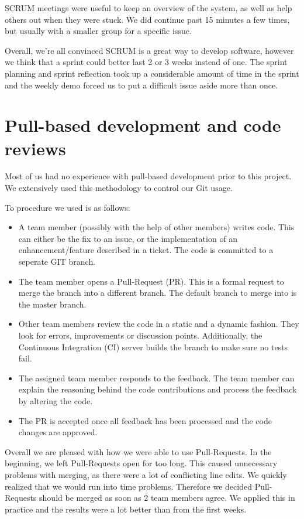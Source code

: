 SCRUM meetings were useful to keep an overview of the system, as well as help others out when they were stuck.
We did continue past 15 minutes a few times, but usually with a smaller group for a specific issue.

Overall, we're all convinced SCRUM is a great way to develop software, however we think that a sprint could better last 2 or 3 weeks instead of one.
The sprint planning and sprint reflection took up a considerable amount of time in the sprint and the weekly demo forced us to put a difficult issue aside more than once.

\section{Pull-based development and code reviews}
Most of us had no experience with pull-based development prior to this project.
We extensively used this methodology to control our Git usage.

To procedure we used is as follows:
\begin{itemize}
\item A team member (possibly with the help of other members) writes code.
This can either be the fix to an issue, or the implementation of an enhancement/feature described in a ticket.
The code is committed to a seperate GIT branch.

\item The team member opens a Pull-Request (PR). 
This is a formal request to merge the branch into a different branch.
The default branch to merge into is the master branch.

\item Other team members review the code in a static and a dynamic fashion.
They look for errors, improvements or discussion points. 
Additionally, the Continuous Integration (CI) server builds the branch to make sure no tests fail.

\item The assigned team member responds to the feedback.
The team member can explain the reasoning behind the code contributions and process the feedback by altering the code.

\item The PR is accepted once all feedback has been processed and the code changes are approved.
\end{itemize}

Overall we are pleased with how we were able to use Pull-Requests.
In the beginning, we left Pull-Requests open for too long.
This caused unnecessary problems with merging, as there were a lot of conflicting line edits.
We quickly realized that we would run into time problems.
Therefore we decided Pull-Requests should be merged as soon as 2 team members agree.
We applied this in practice and the results were a lot better than from the first weeks.

